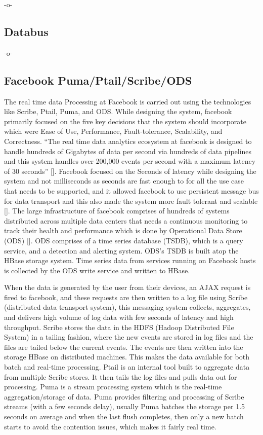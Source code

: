      -o-

\subsection{Databus}

-o- 

\subsection{Facebook Puma/Ptail/Scribe/ODS}
     
The real time data Processing at Facebook is carried out using the
technologies like Scribe, Ptail, Puma, and ODS. While designing the
system, facebook primarily focused on the five key decisions that the
system should incorporate which were Ease of Use, Performance,
Fault-tolerance, Scalability, and Correctness. ``The real time data
analytics ecosystem at facebook is designed to handle hundreds of
Gigabytes of data per second via hundreds of data pipelines and this
system handles over 200,000 events per second with a maximum latency
of 30 seconds'' [\cite{www-facebook}]. Facebook focused on the Seconds
of latency while designing the system and not milliseconds as seconds
are fast enough to for all the use case that needs to be supported,
and it allowed facebook to use persistent message bus for data
transport and this also made the system more fault tolerant and
scalable [\cite{www-facebook}]. The large infrastructure of facebook
comprises of hundreds of systems distributed across multiple data
centers that needs a continuous monitoring to track their health and
performance which is done by Operational Data Store
(ODS) [\cite{facebook-paper-2016}]. ODS comprises of a time series
database (TSDB), which is a query service, and a detection and
alerting system. ODS's TSDB is built atop the HBase storage
system. Time series data from services running on Facebook hosts is
collected by the ODS write service and written to HBase.

When the data is generated by the user from their devices, an AJAX
request is fired to facebook, and these requests are then written to a
log file using Scribe (distributed data transport system), this
messaging system collects, aggregates, and delivers high volume of log
data with few seconds of latency and high throughput. Scribe stores
the data in the HDFS (Hadoop Distributed File System) in a tailing
fashion, where the new events are stored in log files and the files
are tailed below the current events. The events are then written into
the storage HBase on distributed machines. This makes the data
available for both batch and real-time processing. Ptail is an
internal tool built to aggregate data from multiple Scribe stores. It
then tails the log files and pulls data out for processing. Puma is a
stream processing system which is the real-time aggregation/storage of
data. Puma provides filtering and processing of Scribe streams (with a
few seconds delay), usually Puma batches the storage per 1.5 seconds
on average and when the last flush completes, then only a new batch
starts to avoid the contention issues, which makes it fairly real
time.
     
